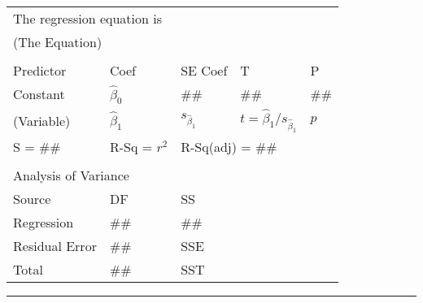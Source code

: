 \documentclass{article}
\begin{document}
	
	\begin{table}[htb]
		\vspace{-0.8em}
		{\minitabOut \small
		\begin{tabular}{lllll}
			\multicolumn{3}{l}{The regression equation is}         &                                     &      \\
			\multicolumn{3}{l}{(The Equation)}                     &                                     &      \\
			&                 &                     &                                     &      \\
			Predictor      & Coef            & SE Coef             & T                                   & P    \\
			Constant       & $\hat{\beta}_0$ & \#\#                & \#\#                                & \#\# \\
			(Variable)     & $\hat{\beta}_1$ & $s_{\hat{\beta}_1}$ & $t=\hat{\beta}_1/s_{\hat{\beta}_1}$ & $p$    \\
			S = \#\#       & R-Sq = $r^2$    & \multicolumn{2}{l}{R-Sq(adj) = \#\#}                      &      \\
			&                 &                     &                                     &      \\
			\multicolumn{3}{l}{Analysis of Variance}               &                                     &      \\
			Source         & DF              & SS                  &                                     &      \\
			Regression     & \#\#            & \#\#                &                                     &      \\
			Residual Error & \#\#            & SSE                 &                                     &      \\
			Total          & \#\#            & SST                 &                                     &     
		\end{tabular}
	}
	\vspace{-0.8em}
	\end{table}
	
	
	{\centering
	\color{red}\rule[2pt]{0.5\textwidth}{0.2em}\color{black}
	}
	
	
\end{document}

